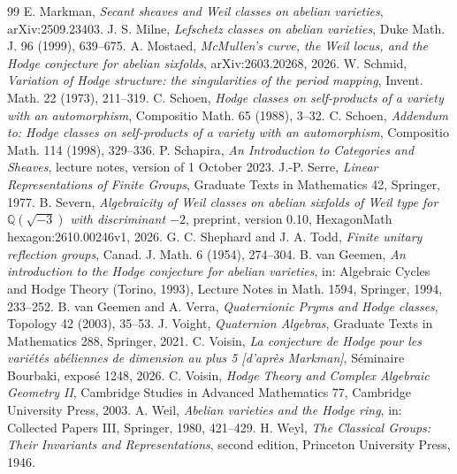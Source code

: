 \documentclass[11pt]{amsart}
\theoremstyle{definition}
\theoremstyle{remark}
\newcommand{\Q}{\mathbb Q}
\begin{document}
\begin{thebibliography}{99}
 E. Markman, \emph{Secant sheaves and Weil classes on abelian varieties}, arXiv:2509.23403.
 J. S. Milne, \emph{Lefschetz classes on abelian varieties}, Duke Math. J. 96 (1999), 639--675.
 A. Mostaed, \emph{McMullen's curve, the Weil locus, and the Hodge conjecture for abelian sixfolds}, arXiv:2603.20268, 2026.
 W. Schmid, \emph{Variation of Hodge structure: the singularities of the period mapping}, Invent. Math. 22 (1973), 211--319.
 C. Schoen, \emph{Hodge classes on self-products of a variety with an automorphism}, Compositio Math. 65 (1988), 3--32.
 C. Schoen, \emph{Addendum to: Hodge classes on self-products of a variety with an automorphism}, Compositio Math. 114 (1998), 329--336.
 P. Schapira, \emph{An Introduction to Categories and Sheaves}, lecture notes, version of 1 October 2023.
 J.-P. Serre, \emph{Linear Representations of Finite Groups}, Graduate Texts in Mathematics 42, Springer, 1977.
 B. Severn, \emph{Algebraicity of Weil classes on abelian sixfolds of Weil type for $\Q(\sqrt{-3})$ with discriminant $-2$}, preprint, version 0.10, HexagonMath hexagon:2610.00246v1, 2026.
 G. C. Shephard and J. A. Todd, \emph{Finite unitary reflection groups}, Canad. J. Math. 6 (1954), 274--304.
 B. van Geemen, \emph{An introduction to the Hodge conjecture for abelian varieties}, in: Algebraic Cycles and Hodge Theory (Torino, 1993), Lecture Notes in Math. 1594, Springer, 1994, 233--252.
 B. van Geemen and A. Verra, \emph{Quaternionic Pryms and Hodge classes}, Topology 42 (2003), 35--53.
 J. Voight, \emph{Quaternion Algebras}, Graduate Texts in Mathematics 288, Springer, 2021.
 C. Voisin, \emph{La conjecture de Hodge pour les vari\'et\'es ab\'eliennes de dimension au plus 5 [d'apr\`es Markman]}, S\'eminaire Bourbaki, expos\'e 1248, 2026.
 C. Voisin, \emph{Hodge Theory and Complex Algebraic Geometry II}, Cambridge Studies in Advanced Mathematics 77, Cambridge University Press, 2003.
 A. Weil, \emph{Abelian varieties and the Hodge ring}, in: Collected Papers III, Springer, 1980, 421--429.
 H. Weyl, \emph{The Classical Groups: Their Invariants and Representations}, second edition, Princeton University Press, 1946.
\end{thebibliography}
\end{document}
